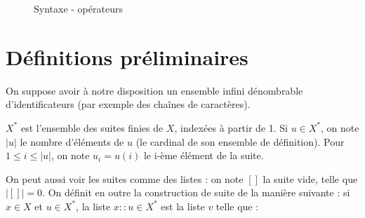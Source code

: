\begin{figure}



  \caption{Syntaxe - opérateurs}
  \label{fig:stx-ops}
\end{figure}

\section{Définitions préliminaires}

On suppose avoir à notre disposition un ensemble infini dénombrable
d'identificateurs \sId (par exemple des chaînes de caractères).

$X^*$ est l'ensemble des suites finies de $X$, indexées à partir de 1. Si $u ∈
X^*$, on note $|u|$ le nombre d'éléments de $u$ (le cardinal de son ensemble de
définition). Pour $1 ≤ i ≤ |u|$, on note $u_i = u(i)$ le i-ème élément de la
suite.

On peut aussi voir les suites comme des listes : on note $[]$ la suite vide,
telle que $|[]| = 0$. On définit en outre la construction de suite de la manière
suivante : si $x ∈ X$ et $u ∈ X^*$, la liste $x::u ∈ X^*$ est la liste $v$ telle
que :

